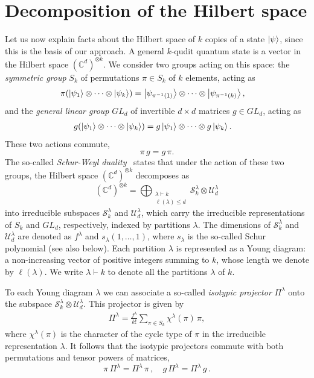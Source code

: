 \documentclass[aps,pra,onecolumn,superscriptaddress]{revtex4-2}
\newcommand{\ot}{\otimes}
\newcommand{\C}{\mathds{C}}
\newcommand{\cdk}{(\C^d)^{\otimes k}}
\begin{document}
\section{Decomposition of the Hilbert space}
Let us now explain facts about the Hilbert space of $k$ copies of a state $\ket{\psi}$, since this is the basis of our approach.
A general $k$-qudit quantum state is a vector in the Hilbert space $\cdk$. We consider two groups acting on this space: the \emph{symmetric group} $S_k$ of permutations $\pi\in S_k$ of $k$ elements, acting as
\begin{align}
    \pi (\ket{\psi_1} \ot \dots \ot \ket{\psi_k}) &= \ket{\psi_{\pi^{-1}(1)}} \ot \dots \ot \ket{\psi_{\pi^{-1}(k)}},
\end{align}
and the \emph{general linear group} $GL_d$ of invertible $d\times d$ matrices $g\in GL_d$, acting as
\begin{align}
g(\ket{\psi_1} \ot \dots \ot \ket{\psi_k}) &=g\ket{\psi_1} \ot \dots \ot g\ket{\psi_k}.
\end{align}
These two actions commute,
\begin{equation}\label{eq:PerUniCommute}
    \pi \, g = g \, \pi.
\end{equation}
The so-called \emph{Schur-Weyl duality}~\cite{fulton2013representation} states that under the action of these two groups, the Hilbert space $\cdk$ decomposes as
\begin{equation}
    \cdk = \bigoplus_{\substack{\lambda\vdash k \\ \ell(\lambda)\leq d}} \mathcal{S}^\lambda_k \ot \mathcal{U}^\lambda_d
\end{equation}
into irreducible subspaces $\mathcal{S}^\lambda_k$ and $\mathcal{U}^\lambda_d$, which carry the irreducible representations
of $S_k$ and $GL_d$, respectively, indexed by partitions $\lambda$. The dimensions of $\mathcal{S}^\lambda_k$ and $\mathcal{U}^\lambda_d$ are denoted as $f^\lambda$ and $s_\lambda(1,\dots,1)$, where $s_\lambda$ is the so-called Schur polynomial (see also below). Each partition $\lambda$ is represented as a Young diagram: a non-increasing vector of positive integers summing to $k$, whose length we denote by $\ell(\lambda)$.  We write $\lambda \vdash k$ to denote all the partitions $\lambda$ of $k$.

To each Young diagram $\lambda$ we can associate a so-called {\em isotypic projector} $\Pi^\lambda$ onto the subspace $\mathcal{S}^\lambda_k \ot \mathcal{U}^\lambda_d$. This projector is given by
\begin{align}
    \Pi^\lambda = \frac{f^\lambda}{k!}\sum_{\pi \in S_k} \chi^\lambda(\pi)\, \pi,
\end{align}
where $\chi^\lambda(\pi)$ is the character of the cycle type of $\pi$ in the irreducible representation $\lambda$. It follows that the isotypic projectors commute with both permutations and tensor powers of matrices,
\begin{equation}
    \pi\,\Pi^\lambda = \Pi^\lambda\,\pi\,,\quad g\,\Pi^\lambda = \Pi^\lambda\,g\,.
\end{equation}
\end{document}

